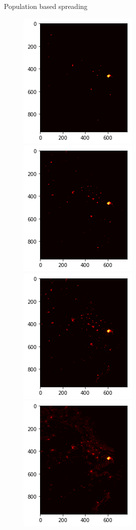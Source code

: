 \documentclass{beamer}
\begin{document}
\begin{frame}{Population based spreading}
  \begin{figure}
    \includegraphics[width = 0.4\linewidth]{pics/ntl/ntl_4.png}
    \includegraphics[width = 0.4\linewidth]{pics/ntl/ntl_3.png}
    \includegraphics[width = 0.4\linewidth]{pics/ntl/ntl_2.png}
    \includegraphics[width = 0.4\linewidth]{pics/ntl/ntl_1.png}
  \end{figure}
\end{frame}
\end{document}
